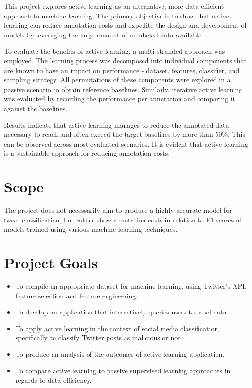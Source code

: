 \documentclass[a4paper,12pt]{article}
\begin{document}
This project explores active learning as an alternative, more data-efficient approach to machine learning. The primary objective is to show that active learning can reduce annotation costs and expedite the design and development of models by leveraging the large amount of unlabeled data available.

To evaluate the benefits of active learning, a multi-stranded approach was employed. The learning process was decomposed into individual components that are known to have an impact on performance - dataset, features, classifier, and sampling strategy. All permutations of these components were explored in a passive scenario to obtain reference baselines. Similarly, iterative active learning was evaluated by recording the performance per annotation and comparing it against the baselines.

Results indicate that active learning manages to reduce the annotated data necessary to reach and often exceed the target baselines by more than 50\%. This can be observed across most evaluated scenarios. It is evident that active learning is a sustainable approach for reducing annotation costs.
\section*{Scope}
The project does not necessarily aim to produce a highly accurate model for tweet classification, but rather show annotation costs in relation to F1-scores of models trained using various machine learning techniques.
\section*{Project Goals}
\begin{itemize}
    \item To compile an appropriate dataset for machine learning, using Twitter's API, feature selection and feature engineering.
    \item To develop an application that interactively queries users to label data.
    \item To apply active learning in the context of social media classification, specifically to classify Twitter posts as malicious or not.
    \item To produce an analysis of the outcomes of active learning application.
    \item To compare active learning to passive supervised learning approaches in regards to data efficiency.
\end{itemize}
\newpage

\tableofcontents
\newpage
\end{document}
